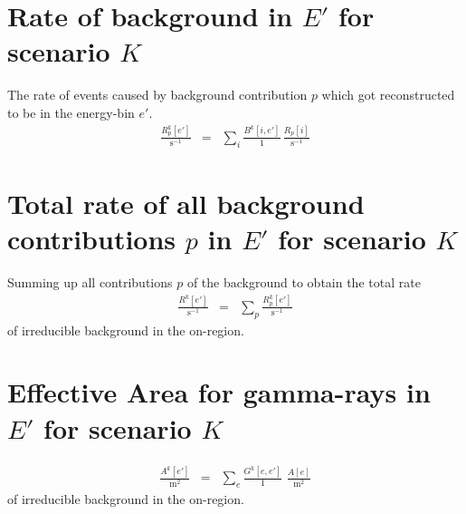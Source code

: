 \documentclass{article}%
\begin{document}
\section{Rate of background in $E'$ for scenario $K$}
%
The rate of events caused by background contribution $p$ which got reconstructed to be in the energy-bin $e'$.
%
\begin{eqnarray}
\frac{R^k_p[e']}{\text{s}^{-1}}
&=&
\sum_{i}
\frac{B^k[i, e']}{1} \,
\frac{R_p[i]}{\text{s}^{-1}}
\end{eqnarray}
%
\section{Total rate of all background contributions $p$ in $E'$ for scenario $K$}
%
Summing up all contributions $p$ of the background to obtain the total rate
%
\begin{eqnarray}
\frac{R^k[e']}{\text{s}^{-1}}
&=&
\sum_{p}
\frac{R^k_p[e']}{\text{s}^{-1}}
\end{eqnarray}
%
of irreducible background in the on-region.
%
\section{Effective Area for gamma-rays in $E'$ for scenario $K$}
%
\begin{eqnarray}
\frac{A^k[e']}{\text{m}^2}
&=&
\sum_{e}
\frac{G^k[e, e']}{1} \,\,
\frac{A[e]}{\text{m}^2}
\end{eqnarray}
%
of irreducible background in the on-region.
%
%
%
%
\end{document}
